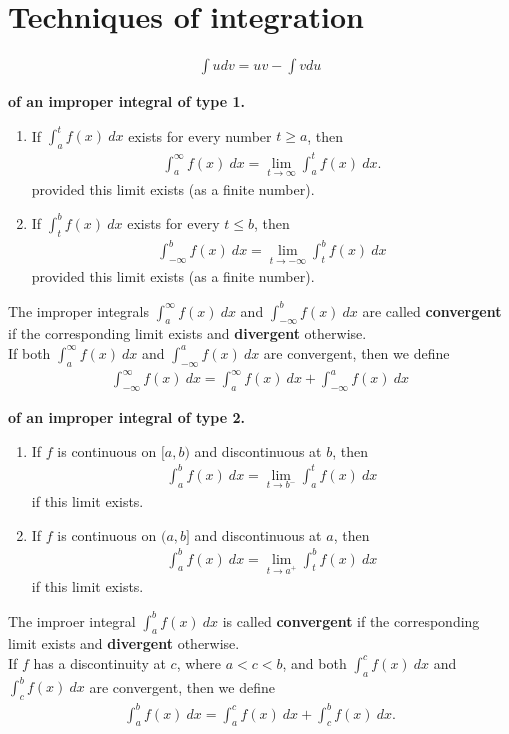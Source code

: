 \documentclass{article}
\begin{document}
\section{Techniques of integration}
\begin{theorem}
	\begin{align*}
		\int u dv = uv - \int v du
	\end{align*}
\end{theorem}
\begin{definition}
	\textbf{of an improper integral of type 1.}
	\begin{enumerate}
		\item If $\int_a^t f(x)\:dx$ exists for every number $t\geq a$, then
		      \begin{align*}
			      \int_a^\infty f(x)\:dx = \lim_{t\to \infty}\int_a^t f(x)\:dx.
		      \end{align*}
		      provided this limit exists (as a finite number).
		\item If $\int_t^b f(x)\:dx$ exists for every $t\leq b$, then
		      \begin{align*}
			      \int_{-\infty}^b f(x)\: dx = \lim_{t\to-\infty}\int_t^b f(x)\:dx
		      \end{align*}
		      provided this limit exists (as a finite number).
	\end{enumerate}
	The improper integrals $\int_a^\infty f(x)\:dx$ and $\int_{-\infty}^b f(x)\:dx$ are called \textbf{convergent} if the corresponding limit exists and \textbf{divergent} otherwise.\\
	If both  $\int_a^\infty f(x)\:dx$ and $\int_{-\infty}^a f(x)\:dx$ are convergent, then we define
	\begin{align*}
		\int_{-\infty}^\infty f(x)\:dx = \int_a^\infty f(x)\:dx + \int_{-\infty}^a f(x)\:dx
	\end{align*}
\end{definition}
\begin{definition}
	\textbf{of an improper integral of type 2.}
	\begin{enumerate}
		\item If $f$ is continuous on $[a,b)$ and discontinuous at $b$, then
		      \begin{align*}
			      \int_a^b f(x)\:dx = \lim_{t\to b^-}\int_a^t f(x)\: dx
		      \end{align*}
		      if this limit exists.
		\item If $f$ is continuous on $(a,b]$ and discontinuous at $a$, then
		      \begin{align*}
			      \int_a^b f(x)\:dx = \lim_{t\to a^+}\int_t^b f(x)\: dx
		      \end{align*}
		      if this limit exists.
	\end{enumerate}
	The improer integral $\int_a^b f(x)\:dx$ is called \textbf{convergent} if the corresponding limit exists and \textbf{divergent} otherwise.\\
	If $f$ has a discontinuity at $c$, where $a<c<b$, and both $\int_a^c f(x)\:dx$ and $\int_c^b f(x)\:dx$ are convergent, then we define
	\begin{align*}
		\int_a^b f(x)\: dx = \int_a^c f(x)\:dx + \int_c^b f(x)\:dx.
	\end{align*}
\end{definition}
\end{document}
